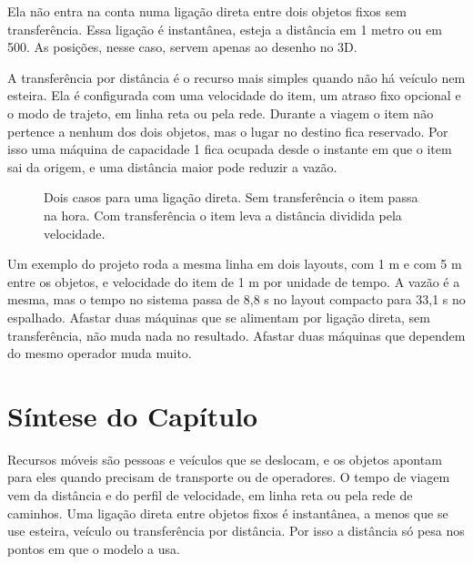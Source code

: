 Ela não entra na conta numa ligação direta entre dois objetos fixos sem transferência. Essa ligação é instantânea, esteja a distância em 1 metro ou em 500. As posições, nesse caso, servem apenas ao desenho no 3D.

A transferência por distância é o recurso mais simples quando não há veículo nem esteira. Ela é configurada com uma velocidade do item, um atraso fixo opcional e o modo de trajeto, em linha reta ou pela rede. Durante a viagem o item não pertence a nenhum dos dois objetos, mas o lugar no destino fica reservado. Por isso uma máquina de capacidade 1 fica ocupada desde o instante em que o item sai da origem, e uma distância maior pode reduzir a vazão.

\begin{figure}[ht]
\centering
{}
\caption{Dois casos para uma ligação direta. Sem transferência o item passa na hora. Com transferência o item leva a distância dividida pela velocidade.}
\label{fig-transferencia}
\end{figure}

Um exemplo do projeto roda a mesma linha em dois layouts, com 1 m e com 5 m entre os objetos, e velocidade do item de 1 m por unidade de tempo. A vazão é a mesma, mas o tempo no sistema passa de 8,8 s no layout compacto para 33,1 s no espalhado. Afastar duas máquinas que se alimentam por ligação direta, sem transferência, não muda nada no resultado. Afastar duas máquinas que dependem do mesmo operador muda muito.

\section{Síntese do Capítulo}

\begin{sintese}
Recursos móveis são pessoas e veículos que se deslocam, e os objetos apontam para eles quando precisam de transporte ou de operadores. O tempo de viagem vem da distância e do perfil de velocidade, em linha reta ou pela rede de caminhos. Uma ligação direta entre objetos fixos é instantânea, a menos que se use esteira, veículo ou transferência por distância. Por isso a distância só pesa nos pontos em que o modelo a usa.
\end{sintese}
